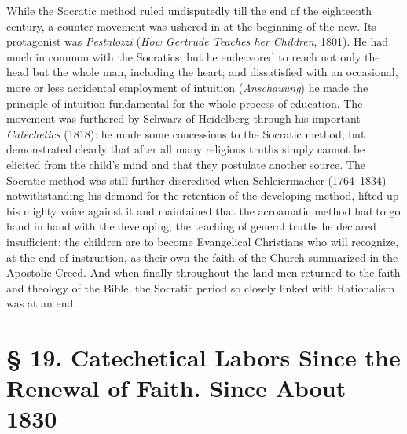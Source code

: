 While the Socratic method ruled undisputedly till the end of the eighteenth century, a counter movement was ushered in at the beginning of the new. Its protagonist was \emph{Pestalozzi} (\emph{How Gertrude Teaches her Children}, 1801). He had much in common with the Socratics, but he endeavored to reach not only the head but the whole man, including the heart; and dissatisfied with an occasional, more or less accidental employment of intuition (\emph{Anschauung}) he made the principle of intuition fundamental for the whole process of education. The movement was furthered by Schwarz of Heidelberg through his important \emph{Catechetics} (1818): he
made some concessions to the Socratic method, but demonstrated clearly that after all many religious truths simply cannot be elicited from the child’s mind and that they postulate another source. The Socratic method was still further discredited when Schleiermacher (1764–1834) notwithstanding his demand for the retention of the developing method, lifted up his mighty voice against it and maintained that the acroamatic method had to go hand in hand with the developing; the teaching of general truths he declared insufficient: the children are to become Evangelical Christians who will recognize, at the end of instruction, as their own the faith of the Church summarized in the Apostolic Creed. And when finally throughout the land men returned to the faith and theology of the Bible, the Socratic period so closely linked with Rationalism was at an end.

\section[§ 19. Catechetical Labors Since the Renewal of Faith]{§ 19. Catechetical Labors Since the Renewal of Faith. Since About 1830}

